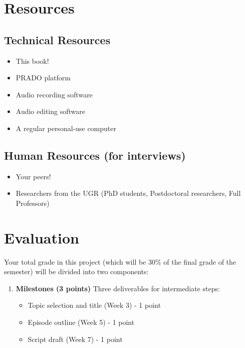\documentclass[
  letterpaper,
  DIV=11,
  numbers=noendperiod]{scrreprt}
\providecommand{\tightlist}{%
  \setlength{\itemsep}{0pt}\setlength{\parskip}{0pt}}\usepackage{longtable,booktabs,array}
\begin{document}
\section{Resources}\label{resources}

\subsection{Technical Resources}\label{technical-resources}

\begin{itemize}
\tightlist
\item
  This book!
\item
  PRADO platform
\item
  Audio recording software
\item
  Audio editing software
\item
  A regular personal-use computer
\end{itemize}

\subsection{Human Resources (for
interviews)}\label{human-resources-for-interviews}

\begin{itemize}
\tightlist
\item
  Your peers!
\item
  Researchers from the UGR (PhD students, Postdoctoral researchers, Full
  Professors)
\end{itemize}

\section{Evaluation}\label{evaluation}

Your total grade in this project (which will be 30\% of the final grade
of the semester) will be divided into two components:

\begin{enumerate}
\def\labelenumi{\arabic{enumi}.}
\tightlist
\item
  \textbf{Milestones (3 points)} Three deliverables for intermediate
  steps:

  \begin{itemize}
  \tightlist
  \item
    Topic selection and title (Week 3) - 1 point
  \item
    Episode outline (Week 5) - 1 point
  \item
    Script draft (Week 7) - 1 point
  \end{itemize}
\end{enumerate}
\end{document}
